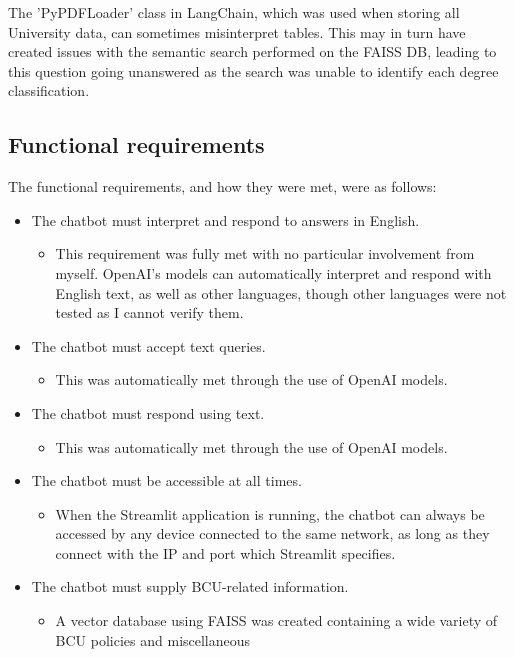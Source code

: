 \noindent The 'PyPDFLoader' class in LangChain, which was used when storing all University data, can sometimes misinterpret tables. 
This may in turn have created issues with the semantic search performed on the FAISS DB, leading to this question going unanswered as 
the search was unable to identify each degree classification.


\subsection{Functional requirements} 
The functional requirements, and how they were met, were as follows:

\begin{itemize}
    \item The chatbot must interpret and respond to answers in English.
    \begin{itemize}
        \item This requirement was fully met with no particular involvement from myself. OpenAI's models can automatically 
        interpret and respond with English text, as well as other languages, though other languages were not tested as I 
        cannot verify them. 
    \end{itemize}
    \item The chatbot must accept text queries.
    \begin{itemize}
        \item This was automatically met through the use of OpenAI models.
    \end{itemize}
    \item The chatbot must respond using text.
    \begin{itemize}
        \item This was automatically met through the use of OpenAI models.
    \end{itemize}
    \item The chatbot must be accessible at all times.
    \begin{itemize}
        \item When the Streamlit application is running, the chatbot can always be accessed 
        by any device connected to the same network, as long as they connect with the IP and port
        which Streamlit specifies.
    \end{itemize}
    \item The chatbot must supply BCU-related information.
    \begin{itemize}
        \item A vector database using FAISS was created containing a wide variety of BCU policies and miscellaneous

\end{itemize}
\end{itemize}
